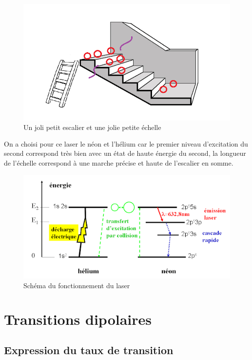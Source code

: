 \begin{figure}[htp]
    \centering
    \includegraphics[scale=1.0]{Images2/Escalier 1.png}
    \caption{Un joli petit escalier et une jolie petite échelle}
    \label{fig:Analogie}
\end{figure}
On a choisi pour ce laser le néon et l'hélium car le premier niveau d'excitation du second correspond très bien avec un état de haute énergie du second, la longueur de l'échelle correspond à une marche précise et haute de l'escalier en somme.\\
\begin{figure}[htp]
    \centering
    \includegraphics[scale=0.8]{Images2/hélium-néon.png}
    \caption{Schéma du fonctionnement du laser}
    \label{fig:schema_helium-neon}
\end{figure}



\newpage
\section{Transitions dipolaires}
\subsection{Expression du taux de transition}




